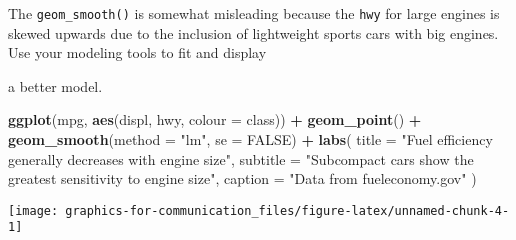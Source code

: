 \documentclass[]{book}
\newenvironment{Shaded}{\begin{snugshade}}{\end{snugshade}}
\newcommand{\DataTypeTok}[1]{\textcolor[rgb]{0.13,0.29,0.53}{#1}}
\newcommand{\KeywordTok}[1]{\textcolor[rgb]{0.13,0.29,0.53}{\textbf{#1}}}
\newcommand{\NormalTok}[1]{#1}
\newcommand{\OperatorTok}[1]{\textcolor[rgb]{0.81,0.36,0.00}{\textbf{#1}}}
\newcommand{\OtherTok}[1]{\textcolor[rgb]{0.56,0.35,0.01}{#1}}
\newcommand{\StringTok}[1]{\textcolor[rgb]{0.31,0.60,0.02}{#1}}
\theoremstyle{plain}
\theoremstyle{remark}
\begin{document}
The \texttt{geom\_smooth()} is somewhat misleading because the
\texttt{hwy} for large engines is skewed upwards due to the inclusion of
lightweight sports cars with big engines. Use your modeling tools to fit
and display

a better model.

\begin{Shaded}
\begin{Highlighting}[]
\KeywordTok{ggplot}\NormalTok{(mpg, }\KeywordTok{aes}\NormalTok{(displ, hwy, }\DataTypeTok{colour =}\NormalTok{ class)) }\OperatorTok{+}
\StringTok{  }\KeywordTok{geom_point}\NormalTok{() }\OperatorTok{+}
\StringTok{  }\KeywordTok{geom_smooth}\NormalTok{(}\DataTypeTok{method =} \StringTok{"lm"}\NormalTok{, }\DataTypeTok{se =} \OtherTok{FALSE}\NormalTok{) }\OperatorTok{+}
\StringTok{  }\KeywordTok{labs}\NormalTok{(}
    \DataTypeTok{title =} \StringTok{"Fuel efficiency generally decreases with engine size"}\NormalTok{,}
    \DataTypeTok{subtitle =} \StringTok{"Subcompact cars show the greatest sensitivity to engine size"}\NormalTok{,}
    \DataTypeTok{caption =} \StringTok{"Data from fueleconomy.gov"}
\NormalTok{  )}
\end{Highlighting}
\end{Shaded}

\begin{center}\texttt{[image: graphics-for-communication\_files/figure-latex/unnamed-chunk-4-1]} \end{center}

\begin{Shaded}
\end{Shaded}
\end{document}
